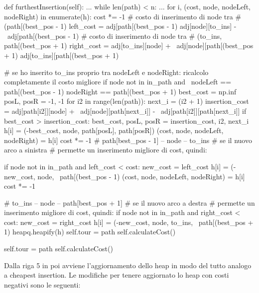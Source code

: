 \documentclass[a4paper,12pt]{report}
\begin{document}
\begin{python}
def furthestInsertion(self):
  ...
  while len(path) < n:
    ...
    for i, (cost, node, nodeLeft, nodeRight) in enumerate(h):
      cost *= -1
      # costo di inserimento di node tra 
      # (path[(best_pos - 1) %
      left_cost = adj[path[(best_pos - 1) %
                  adj[node][to_ins] - \
                  adj[path[(best_pos - 1) %
      # costo di inserimento di node tra 
      # (to_ins, path[(best_pos + 1) %
      right_cost = adj[to_ins][node] + \
                   adj[node][path[(best_pos + 1) %
                   adj[to_ins][path[(best_pos + 1) %

      # se ho inserito to_ins proprio tra nodeLeft e nodeRight: ricalcolo completamente il costo migliore
      if node not in in_path and \
         nodeLeft == path[(best_pos - 1) %
         nodeRight == path[(best_pos + 1) %
        best_cost = np.inf
        posL, posR = -1, -1
        for i2 in range(len(path)):
          next_i = (i2 + 1) %
          insertion_cost = adj[path[i2]][node] + \
                           adj[node][path[next_i]] - \
                           adj[path[i2]][path[next_i]]
          if best_cost > insertion_cost:
            best_cost, posL, posR = insertion_cost, i2, next_i
        h[i] = (-best_cost, node, path[posL], path[posR])
        (cost, node, nodeLeft, nodeRight) = h[i]
        cost *= -1
      # path[best_pos - 1] -- node -- to_ins
      # se il nuovo arco a sinistra 
      # permette un inserimento migliore di cost, quindi:
                  
      if node not in in_path and left_cost < cost:
        new_cost = left_cost
        h[i] = (-new_cost, node, \
                path[(best_pos - 1) %
        (cost, node, nodeLeft, nodeRight) = h[i]
        cost *= -1

      # to_ins -- node -- path[best_pos + 1] 
      # se il nuovo arco a destra
      # permette un inserimento migliore di cost, quindi:
      if node not in in_path and right_cost < cost:
        new_cost = right_cost
        h[i] = (-new_cost, node, to_ins, \
                path[(best_pos + 1) %
    heapq.heapify(h)
  self.tour = path
  self.calculateCost()

self.tour = path
self.calculateCost()
\end{python}
Dalla riga 5 in poi avviene l'aggiornamento dello heap in modo del tutto analogo a cheapest insertion. Le modifiche per tenere aggiornato lo heap con costi negativi sono le seguenti:
\end{document}
